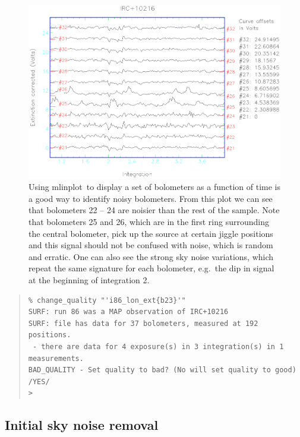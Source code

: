 \documentclass[twoside,11pt]{article}
\newenvironment{myquote}{\begin{quote}\begin{small}}{\end{small}\end{quote}}
\newcommand{\task}[1]{\textsf{#1}}
\newcommand{\mlinplot}{\xref{\task{mlinplot}}{sun95}{MLINPLOT}}
\newcommand{\xref}[3]{#1}
\newcommand{\xlabel}[1]{}
\renewcommand{\_}{\texttt{\symbol{95}}}
\begin{document}
\begin{figure}
\begin{center}
\includegraphics[width=\textwidth]{sc11_fig3.eps}
\caption{Using \mlinplot\ to display a set of bolometers as a function
of time is a good way to identify noisy bolometers.  From this
plot we can see that bolometers 22 -- 24 are noisier than the rest of
the sample.  Note that bolometers 25 and 26, which are in the first
ring surrounding the central bolometer, pick up the source at certain
jiggle positions and this signal should not be confused with noise,
which is random and erratic.  One can also see the strong sky noise
variations, which repeat the same signature for each bolometer, e.g.\
the dip in signal at the beginning of integration 2.}


\label{fig:mlin}
\end{center}
\end{figure}


\begin{myquote}
\begin{verbatim}
% change_quality "'i86_lon_ext{b23}'"
SURF: run 86 was a MAP observation of IRC+10216
SURF: file has data for 37 bolometers, measured at 192 positions.
 - there are data for 4 exposure(s) in 3 integration(s) in 1
measurements.
BAD_QUALITY - Set quality to bad? (No will set quality to good) /YES/
>
\end{verbatim}
\end{myquote}


\subsection{\xlabel{Initial_Sky_Noise_Removal}Initial sky noise
removal \label{Initial_Sky_Noise_Removal}}
\end{document}
